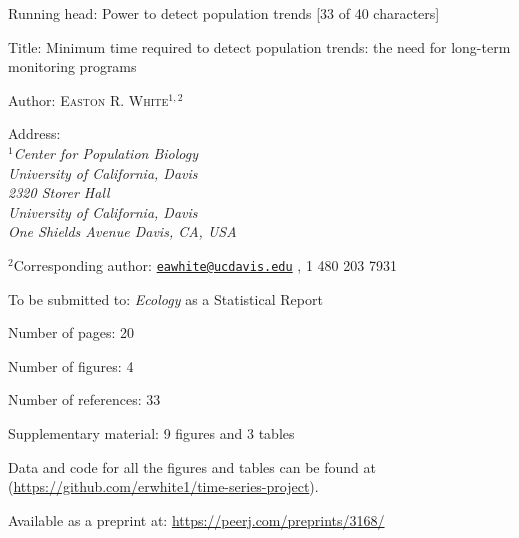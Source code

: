 \documentclass[12pt,]{article}
\title{}
\author{}
\date{}
\begin{document}
Running head: Power to detect population trends {[}33 of 40
characters{]}

Title: Minimum time required to detect population trends: the need for
long-term monitoring programs \vspace{7 mm}

Author: \textsc{Easton R. White$^{1,2}$} \vspace{3 mm}

Address:\emph{
    \\$^1$Center for Population Biology \\
    University of California, Davis \\
    2320 Storer Hall \\
        University of California, Davis \\
        One Shields Avenue Davis, CA, USA} \vspace{3 mm}

\(^2\)Corresponding author:
\href{mailto:eawhite@ucdavis.edu}{\nolinkurl{eawhite@ucdavis.edu}} , 1
480 203 7931 \vspace{1 mm}

To be submitted to: \emph{Ecology} as a Statistical Report \vspace{1 mm}

Number of pages: 20\\
\vspace{1 mm}

Number of figures: 4 \vspace{1 mm}

Number of references: 33 \vspace{1 mm}

Supplementary material: 9 figures and 3 tables \vspace{2 mm}

Data and code for all the figures and tables can be found at
(\url{https://github.com/erwhite1/time-series-project}). \vspace{2 mm}

Available as a preprint at: \url{https://peerj.com/preprints/3168/}
\vspace{2 mm}

\pagebreak

\linenumbers
\end{document}
